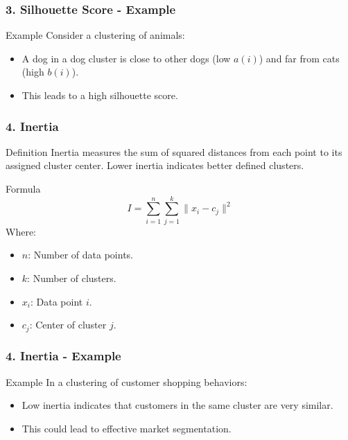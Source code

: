 \documentclass[aspectratio=169]{beamer}
\begin{document}
\begin{frame}[fragile]
    \frametitle{3. Silhouette Score - Example}
    \begin{block}{Example}
        Consider a clustering of animals:
        \begin{itemize}
            \item A dog in a dog cluster is close to other dogs (low $a(i)$) and far from cats (high $b(i)$).
            \item This leads to a high silhouette score.
        \end{itemize}
    \end{block}
\end{frame}

\begin{frame}[fragile]
    \frametitle{4. Inertia}
    \begin{block}{Definition}
        Inertia measures the sum of squared distances from each point to its assigned cluster center. Lower inertia indicates better defined clusters.
    \end{block}
    \begin{block}{Formula}
        \begin{equation}
            I = \sum_{i=1}^{n} \sum_{j=1}^{k} \|x_i - c_j\|^2
        \end{equation}
        Where:
        \begin{itemize}
            \item $n$: Number of data points.
            \item $k$: Number of clusters.
            \item $x_i$: Data point $i$.
            \item $c_j$: Center of cluster $j$.
        \end{itemize}
    \end{block}
\end{frame}

\begin{frame}[fragile]
    \frametitle{4. Inertia - Example}
    \begin{block}{Example}
        In a clustering of customer shopping behaviors:
        \begin{itemize}
            \item Low inertia indicates that customers in the same cluster are very similar.
            \item This could lead to effective market segmentation.
        \end{itemize}
    \end{block}
\end{frame}
\end{document}
